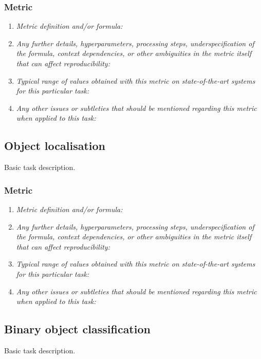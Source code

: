 \documentclass[a4paper,11pt]{article}
\begin{document}
    \subsubsection{Metric}
        \begin{enumerate}[label=\alph*.]
            \item \textit{Metric definition and/or formula:}
            \bigskip
            \item \textit{Any further details, hyperparameters, processing steps, underspecification of the formula, context dependencies, or other ambiguities in the metric itself that can affect reproducibility:}
            \bigskip
            \item \textit{Typical range of values obtained with this metric on state-of-the-art systems for this particular task:}
            \bigskip
            \item \textit{Any other issues or subtleties that should be mentioned regarding this metric when applied to this task:}
            \bigskip
        \end{enumerate}

\subsection{Object localisation}
    Basic task description. 
    \subsubsection{Metric}
        \begin{enumerate}[label=\alph*.]
            \item \textit{Metric definition and/or formula:}
            \bigskip
            \item \textit{Any further details, hyperparameters, processing steps, underspecification of the formula, context dependencies, or other ambiguities in the metric itself that can affect reproducibility:}
            \bigskip
            \item \textit{Typical range of values obtained with this metric on state-of-the-art systems for this particular task:}
            \bigskip
            \item \textit{Any other issues or subtleties that should be mentioned regarding this metric when applied to this task:}
            \bigskip
        \end{enumerate}

\subsection{Binary object classification}
    Basic task description.
\end{document}
